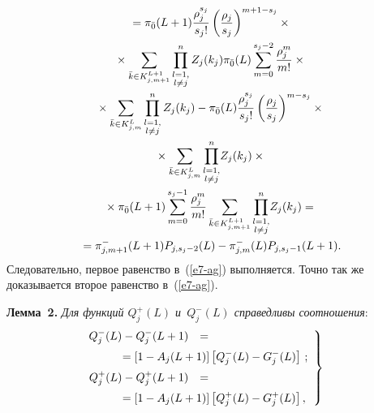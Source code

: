 \begin{multicols}{2}
\noindent
\begin{multline*}
  {}= 
  \pi_{\bar{0}} (L+1) \displaystyle\frac{\displaystyle \rho_j^{s_j}\mathstrut}{\displaystyle s_j!\mathstrut} \left( \displaystyle\frac{\displaystyle \rho_j\mathstrut}{\displaystyle s_j\mathstrut}\right)^{m+1-s_j}\times{}\\
  {}\times  \sum\limits_{\bar{k}\in K^{L+1}_{j,m+1}}\prod\limits^n_{{\substack{{l=1,}\\ {l\not=j}}}} Z_j(k_j)\pi_{\bar{0}}(L) 
\sum\limits_{m=0}^{s_j-2} \displaystyle\frac{\displaystyle \rho_j^m\mathstrut}{\displaystyle m!\mathstrut}\times{}\\
  {}\times 
  \sum\limits_{\bar{k}\in K^L_{j,m}} \prod\limits^n_{{\substack{{l=1,}\\ {l\not=j}}}} Z_j(k_j) -
\pi_{\bar{0}}(L) \displaystyle\frac{\displaystyle \rho_j^{s_j}\mathstrut}{\displaystyle s_j!\mathstrut} \left( \displaystyle\frac{\displaystyle \rho_j\mathstrut}{\displaystyle s_j\mathstrut}\right)^{m-s_j} \times{}\\
{}\times \sum\limits_{\bar{k}\in K^L_{j,m} }\prod\limits^n_{{\substack{{l=1,}\\ {l\not=j}}}} \! Z_j(k_j)\times{}\\
{}\times 
\pi_{\bar{0}}(L+1)  \sum\limits_{m=0}^{s_j-1} \displaystyle\frac{\displaystyle \rho_j^m\mathstrut}{\displaystyle m!\mathstrut} \sum\limits_{\bar{k}\in K^{L+1}_{j,m+1}} \prod\limits^n_{{\substack{{l=1,}\\ {l\not=j}}}} \! Z_j(k_j)={}\\
  {}=
  \pi^-_{j,m+1}(L+1) P_{j,s_j-2}(L) -\pi^-_{j,m}(L) P_{j,s_j-1}(L+1).
  \end{multline*}
Следовательно, первое равенство в~(\ref{e7-ag}) выполняется. Точ\-но так же 
доказывается второе равенство в~(\ref{e7-ag}).

  
  \noindent
  \textbf{Лемма~2.} \textit{Для функций $Q_j^+(L)$ и~$Q_j^-(L)$ спра\-вед\-ливы 
со\-от\-но\-ше\-ния}:
  \begin{equation}
  \left.
  \begin{array}{rl}
  \hspace*{-5mm}Q_j^-(L) -Q_j^-(L+1) &={}\\[6pt]
  &\hspace*{-25mm}{}= \left[ 1-A_j(L+1)\right] \left[ Q_j^-(L) -G_j^-(L)\right]\,;\\[6pt]
 \hspace*{-5mm} Q_j^+(L) -Q_j^+(L+1) &={}\\[6pt]
  &\hspace*{-25mm}{}= \left[ 1-A_j(L+1)\right] \left[ Q_j^+(L) -G_j^+(L)\right],
  \end{array}
  \right\}
  \label{e8-ag}
  \end{equation}
  
  \vspace*{-3pt}
  

\end{multicols}
